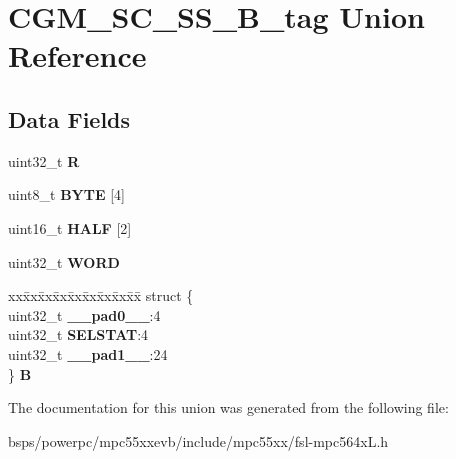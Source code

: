 \hypertarget{unionCGM__SC__SS__32B__tag}{}\section{C\+G\+M\+\_\+\+S\+C\+\_\+\+S\+S\+\_\+B\+\_\+tag Union Reference}
\label{unionCGM__SC__SS__32B__tag}
\subsection*{Data Fields}
\begin{DoxyCompactItemize}
\item 
\mbox{\label{unionCGM__SC__SS__32B__tag_a97dfdd84b53fbb00f43e0e34f9dd8f28}} 
uint32\+\_\+t {\bfseries R}
\item 
\mbox{\label{unionCGM__SC__SS__32B__tag_a36b5051c849622f1c1d5b0f2042014f6}} 
uint8\+\_\+t {\bfseries B\+Y\+TE} \mbox{[}4\mbox{]}
\item 
\mbox{\label{unionCGM__SC__SS__32B__tag_a489ddf76a3941f6cf357016caa91079c}} 
uint16\+\_\+t {\bfseries H\+A\+LF} \mbox{[}2\mbox{]}
\item 
\mbox{\label{unionCGM__SC__SS__32B__tag_a20f8fd792ced24b23de8fc1d0fcf4bfb}} 
uint32\+\_\+t {\bfseries W\+O\+RD}
\item 
\mbox{\label{unionCGM__SC__SS__32B__tag_a3cd35171550db9da16bd0e3c2be6bdec}} 
\begin{tabbing}
xx\=xx\=xx\=xx\=xx\=xx\=xx\=xx\=xx\=\kill
struct \{\\
\>uint32\_t {\bfseries \_\_pad0\_\_}:4\\
\>uint32\_t {\bfseries SELSTAT}:4\\
\>uint32\_t {\bfseries \_\_pad1\_\_}:24\\
\} {\bfseries B}\\

\end{tabbing}\end{DoxyCompactItemize}


The documentation for this union was generated from the following file\+:\begin{DoxyCompactItemize}
\item 
bsps/powerpc/mpc55xxevb/include/mpc55xx/fsl-\/mpc564x\+L.\+h\end{DoxyCompactItemize}
